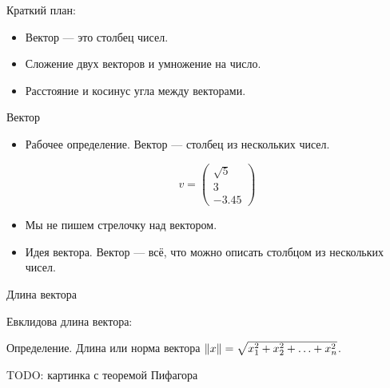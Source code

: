 \documentclass[14pt,xcolor=dvipsnames]{beamer}
\begin{document}
\begin{frame}{Краткий план:}
  \begin{itemize}
    \item Вектор — это столбец чисел.
    \item Сложение двух векторов и умножение на число.
    \item Расстояние и косинус угла между векторами.
  \end{itemize}
  
\end{frame}


\begin{frame}{Вектор}


\begin{itemize}
\item Рабочее определение. \alert{Вектор} — столбец из нескольких чисел.   

\[
v = \begin{pmatrix}
  \sqrt{5} \\
  3 \\
  -3.45
\end{pmatrix}
\]
\item Мы не пишем стрелочку над вектором.

\item Идея вектора. Вектор — всё, что можно описать столбцом из нескольких чисел. 
\end{itemize}

\end{frame}
  



 


\begin{frame}{Длина вектора}

    \alert{Евклидова длина} вектора:

    Определение. \alert{Длина} или \alert{норма} вектора $\norm{x} = \sqrt{x_1^2 + x_2^2 + \ldots + x_n^2}$.

    \begin{block}{TODO: картинка с теоремой Пифагора}

    \end{block}
    
\end{frame}
\end{document}
